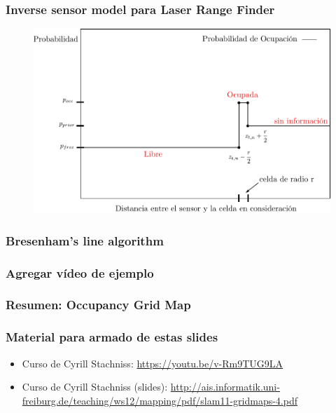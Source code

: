 \begin{frame}
    \frametitle{Inverse sensor model para Laser Range Finder}
    
   	\begin{figure}[!h]
        \includegraphics[width=0.8\columnwidth]{./images/inverse_senor_model_range_finder.pdf}
    \end{figure}
    
\end{frame}

\begin{frame}
    \frametitle{Bresenham's line algorithm}
    
    
\end{frame}

\begin{frame}
    \frametitle{Agregar vídeo de ejemplo}
   
    
\end{frame}

\begin{frame}
    \frametitle{Resumen: Occupancy Grid Map}
    
\end{frame}


\begin{frame}
	\frametitle{Material para armado de estas slides}
    
    \begin{itemize}
	\item Curso de Cyrill Stachniss: \url{https://youtu.be/v-Rm9TUG9LA}

    \item Curso de Cyrill Stachniss (slides): \url{http://ais.informatik.uni-freiburg.de/teaching/ws12/mapping/pdf/slam11-gridmaps-4.pdf}
    \end{itemize}
\end{frame}
